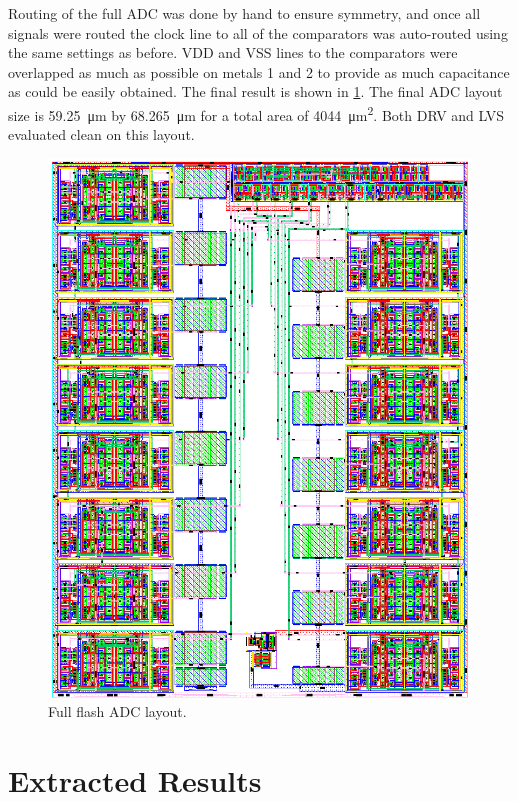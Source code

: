 \documentclass[11pt,letterpaper]{article}
\begin{document}
Routing of the full ADC was done by hand to ensure symmetry, and once all signals were routed the clock line to all of the comparators was auto-routed using the same settings as before. VDD and VSS lines to the comparators were overlapped as much as possible on metals 1 and 2 to provide as much capacitance as could be easily obtained. The final result is shown in \cref{fig:flash-layout}. The final ADC layout size is \qty{59.25}{\um} by \qty{68.265}{\um} for a total area of \qty{4044}{\um\squared}. Both DRV and LVS evaluated clean on this layout.

\begin{figure}[ht!]
    \centering
    \includegraphics[width=\textwidth]{flash_layout.eps}
    \caption{Full flash ADC layout.}\label{fig:flash-layout}
\end{figure}

\section{Extracted Results}
\end{document}
